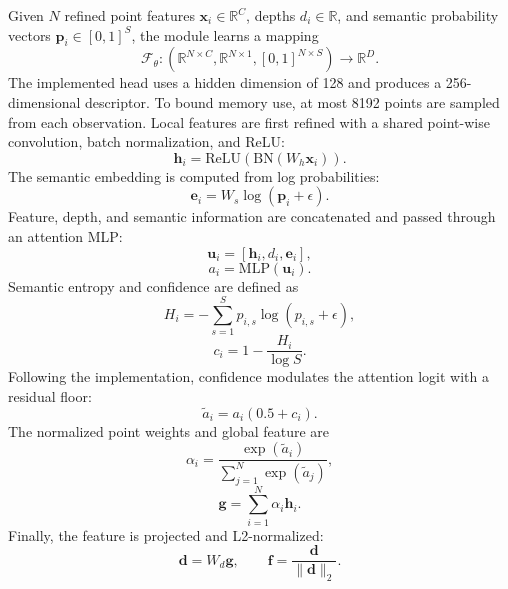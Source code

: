 Given $N$ refined point features $\mathbf{x}_i\in\mathbb{R}^{C}$, depths $d_i\in\mathbb{R}$, and semantic probability vectors $\mathbf{p}_i\in[0,1]^S$, the module learns a mapping
\begin{equation}
	\mathcal{F}_{\theta} :
	\left(\mathbb{R}^{N\times C},\mathbb{R}^{N\times 1},
	[0,1]^{N\times S}\right)\rightarrow\mathbb{R}^{D}.
\end{equation}
The implemented head uses a hidden dimension of 128 and produces a 256-dimensional descriptor. To bound memory use, at most 8192 points are sampled from each observation. Local features are first refined with a shared point-wise convolution, batch normalization, and ReLU:
\begin{equation}
	\mathbf{h}_i =
	\mathrm{ReLU}\!\left(\mathrm{BN}\!\left(W_h\mathbf{x}_i\right)\right).
\end{equation}
The semantic embedding is computed from log probabilities:
\begin{equation}
	\mathbf{e}_i = W_s\log(\mathbf{p}_i+\epsilon).
\end{equation}
Feature, depth, and semantic information are concatenated and passed through an attention MLP:
\begin{equation}
	\mathbf{u}_i = [\mathbf{h}_i,d_i,\mathbf{e}_i],
\end{equation}
\begin{equation}
	a_i = \mathrm{MLP}(\mathbf{u}_i).
\end{equation}
Semantic entropy and confidence are defined as
\begin{equation}
	H_i = -\sum_{s=1}^{S}p_{i,s}\log(p_{i,s}+\epsilon),
\end{equation}
\begin{equation}
	c_i = 1-\frac{H_i}{\log S}.
\end{equation}
Following the implementation, confidence modulates the attention logit with a residual floor:
\begin{equation}
	\tilde{a}_i = a_i(0.5+c_i).
\end{equation}
The normalized point weights and global feature are
\begin{equation}
	\alpha_i =
	\frac{\exp(\tilde{a}_i)}
	{\sum_{j=1}^{N}\exp(\tilde{a}_j)},
\end{equation}
\begin{equation}
	\mathbf{g} = \sum_{i=1}^{N}\alpha_i\mathbf{h}_i.
\end{equation}
Finally, the feature is projected and L2-normalized:
\begin{equation}
	\mathbf{d}=W_d\mathbf{g},
	\qquad
	\mathbf{f}=\frac{\mathbf{d}}{\|\mathbf{d}\|_2}.
\end{equation}
